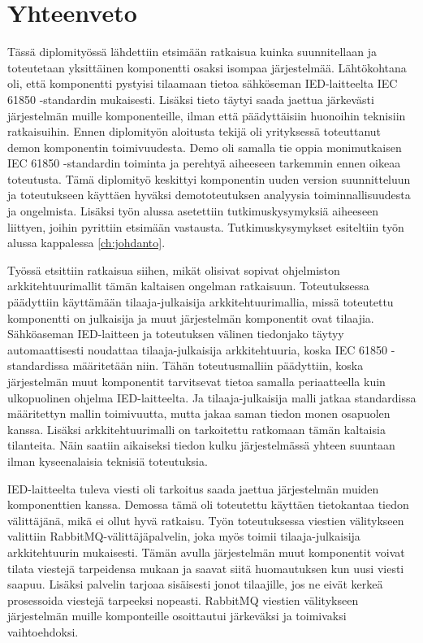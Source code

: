 \chapter{Yhteenveto}
\label{ch:yhteenveto}
Tässä diplomityössä lähdettiin etsimään ratkaisua kuinka suunnitellaan ja toteutetaan yksittäinen komponentti osaksi isompaa järjestelmää. Lähtökohtana oli, että komponentti pystyisi tilaamaan tietoa sähköseman IED-laitteelta IEC 61850 -standardin mukaisesti. Lisäksi tieto täytyi saada jaettua järkevästi järjestelmän muille komponenteille, ilman että päädyttäisiin huonoihin teknisiin ratkaisuihin. Ennen diplomityön aloitusta tekijä oli yrityksessä toteuttanut demon komponentin toimivuudesta. Demo oli samalla tie oppia monimutkaisen IEC 61850 -standardin toiminta ja perehtyä aiheeseen tarkemmin ennen oikeaa toteutusta. Tämä diplomityö keskittyi komponentin uuden version suunnitteluun ja toteutukseen käyttäen hyväksi demototeutuksen analyysia toiminnallisuudesta ja ongelmista. Lisäksi työn alussa asetettiin tutkimuskysymyksiä aiheeseen liittyen, joihin pyrittiin etsimään vastausta. Tutkimuskysymykset esiteltiin työn alussa kappalessa \ref{ch:johdanto}.

Työssä etsittiin ratkaisua siihen, mikät olisivat sopivat ohjelmiston arkkitehtuurimallit tämän kaltaisen ongelman ratkaisuun. Toteutuksessa päädyttiin käyttämään tilaaja-julkaisija arkkitehtuurimallia, missä toteutettu komponentti on julkaisija ja muut järjestelmän komponentit ovat tilaajia. Sähköaseman IED-laitteen ja toteutuksen välinen tiedonjako täytyy automaattisesti noudattaa tilaaja-julkaisija arkkitehtuuria, koska IEC 61850 -standardissa määritetään niin. Tähän toteutusmalliin päädyttiin, koska järjestelmän muut komponentit tarvitsevat tietoa samalla periaatteella kuin ulkopuolinen ohjelma IED-laitteelta. Ja tilaaja-julkaisija malli jatkaa standardissa määritettyn mallin toimivuutta, mutta jakaa saman tiedon monen osapuolen kanssa. Lisäksi arkkitehtuurimalli on tarkoitettu ratkomaan tämän kaltaisia tilanteita. Näin saatiin aikaiseksi tiedon kulku järjestelmässä yhteen suuntaan ilman kyseenalaisia teknisiä toteutuksia.

IED-laitteelta tuleva viesti oli tarkoitus saada jaettua järjestelmän muiden komponenttien kanssa. Demossa tämä oli toteutettu käyttäen tietokantaa tiedon välittäjänä, mikä ei ollut hyvä ratkaisu. Työn toteutuksessa viestien välitykseen valittiin RabbitMQ-välittäjäpalvelin, joka myös toimii tilaaja-julkaisija arkkitehtuurin mukaisesti. Tämän avulla järjestelmän muut komponentit voivat tilata viestejä tarpeidensa mukaan ja saavat siitä huomautuksen kun uusi viesti saapuu. Lisäksi palvelin tarjoaa sisäisesti jonot tilaajille, jos ne eivät kerkeä prosessoida viestejä tarpeeksi nopeasti. RabbitMQ viestien välitykseen järjestelmän muille komponteille osoittautui järkeväksi ja toimivaksi vaihtoehdoksi.

